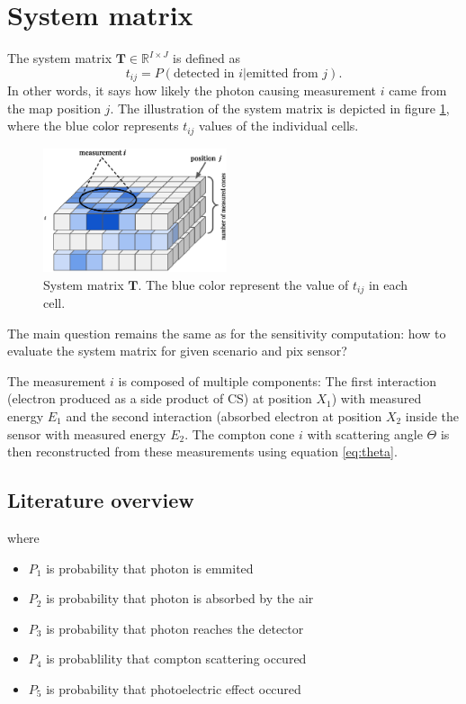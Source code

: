 \section{System matrix}
The system matrix $\mathbf{T} \in \mathbb{R}^{I \times J}$ is defined as
\begin{equation}
t_{ij} =  P(\textrm{detected in } i | \textrm{emitted from } j).
\end{equation}
In other words, it says how likely the photon causing measurement $i$ came from the map position $j$.
The illustration of the system matrix is depicted in figure \ref{fig:sys_ilustration}, where the blue color represents $t_{ij}$ values of the individual cells. 
\begin{figure}[!h]
  \centering

    \includegraphics[width=0.48\textwidth]{./fig/photos/sys.eps}
  \caption{System matrix $\mathbf{T}$. The blue color represent the value of $t_{ij}$ in each cell.}
    \label{fig:sys_ilustration}
\end{figure}

The main question remains the same as for the sensitivity computation: how to evaluate the system matrix for given scenario and \ac{pix} sensor?

The measurement $i$ is composed of multiple components:
The first interaction (electron produced as a side product of \ac{CS}) at position $X_{1}$) with measured energy $E_{1}$ 
and the second interaction (absorbed electron at position $X_{2}$ inside the sensor with measured energy $E_{2}$.
The compton cone $i$ with scattering angle $\Theta$ is then reconstructed from these measurements using equation \ref{eq:theta}.



\subsection{Literature overview}

where 
\begin{itemize}
  \item $P_{1}$ is probability that photon is emmited
  \item $P_{2}$ is probability that photon is absorbed by the air
  \item $P_{3}$ is probability that photon reaches the detector
  \item $P_{4}$ is probablility that compton scattering occured
  \item $P_{5}$ is probability that photoelectric effect occured
\end{itemize}







